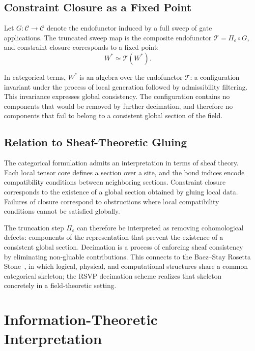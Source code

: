 \documentclass[11pt]{article}
\theoremstyle{definition}
\begin{document}
\subsection{Constraint Closure as a Fixed Point}

Let $G : \mathcal{C} \to \mathcal{C}$ denote the endofunctor induced by a full
sweep of gate applications. The truncated sweep map is the composite endofunctor
$\mathcal{T} = \Pi_\varepsilon \circ G$, and constraint closure corresponds to
a fixed point:
\begin{equation}
  W^* \simeq \mathcal{T}(W^*).
\end{equation}

In categorical terms, $W^*$ is an algebra over the endofunctor $\mathcal{T}$:
a configuration invariant under the process of local generation followed by
admissibility filtering. This invariance expresses global consistency. The
configuration contains no components that would be removed by further
decimation, and therefore no components that fail to belong to a consistent
global section of the field.

\subsection{Relation to Sheaf-Theoretic Gluing}

The categorical formulation admits an interpretation in terms of sheaf theory.
Each local tensor core defines a section over a site, and the bond indices
encode compatibility conditions between neighboring sections. Constraint closure
corresponds to the existence of a global section obtained by gluing local data.
Failures of closure correspond to obstructions where local compatibility
conditions cannot be satisfied globally.

The truncation step $\Pi_\varepsilon$ can therefore be interpreted as removing
cohomological defects: components of the representation that prevent the
existence of a consistent global section. Decimation is a process of enforcing
sheaf consistency by eliminating non-gluable contributions. This connects to
the Baez--Stay Rosetta Stone~\cite{baezstay}, in which logical, physical, and
computational structures share a common categorical skeleton; the RSVP
decimation scheme realizes that skeleton concretely in a field-theoretic
setting.

\section{Information-Theoretic Interpretation}
\end{document}

